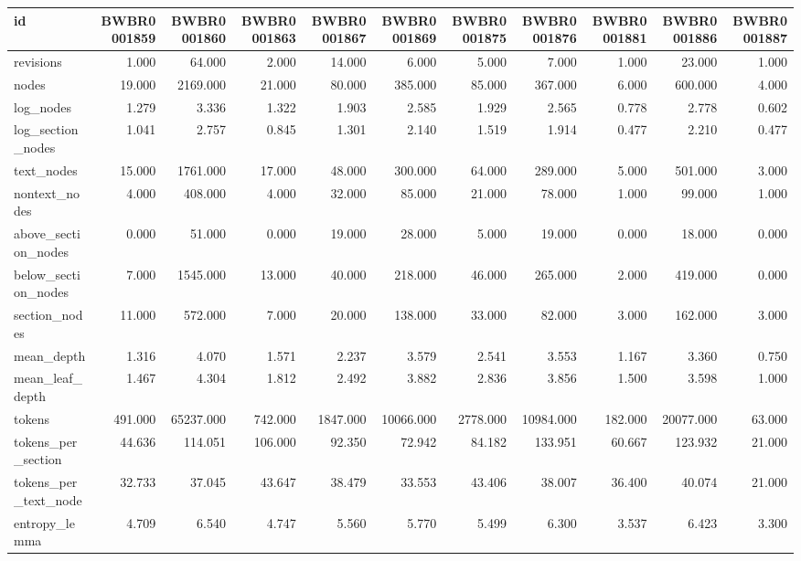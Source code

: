 \begin{tabular}{lrrrrrrrrrr}
\toprule
id & BWBR0001859 & BWBR0001860 & BWBR0001863 & BWBR0001867 & BWBR0001869 & BWBR0001875 & BWBR0001876 & BWBR0001881 & BWBR0001886 & BWBR0001887 \\
\midrule
revisions & 1.000 & 64.000 & 2.000 & 14.000 & 6.000 & 5.000 & 7.000 & 1.000 & 23.000 & 1.000 \\
\cline{1-11}
nodes & 19.000 & 2169.000 & 21.000 & 80.000 & 385.000 & 85.000 & 367.000 & 6.000 & 600.000 & 4.000 \\
\cline{1-11}
log\_nodes & 1.279 & 3.336 & 1.322 & 1.903 & 2.585 & 1.929 & 2.565 & 0.778 & 2.778 & 0.602 \\
\cline{1-11}
log\_section\_nodes & 1.041 & 2.757 & 0.845 & 1.301 & 2.140 & 1.519 & 1.914 & 0.477 & 2.210 & 0.477 \\
\cline{1-11}
text\_nodes & 15.000 & 1761.000 & 17.000 & 48.000 & 300.000 & 64.000 & 289.000 & 5.000 & 501.000 & 3.000 \\
\cline{1-11}
nontext\_nodes & 4.000 & 408.000 & 4.000 & 32.000 & 85.000 & 21.000 & 78.000 & 1.000 & 99.000 & 1.000 \\
\cline{1-11}
above\_section\_nodes & 0.000 & 51.000 & 0.000 & 19.000 & 28.000 & 5.000 & 19.000 & 0.000 & 18.000 & 0.000 \\
\cline{1-11}
below\_section\_nodes & 7.000 & 1545.000 & 13.000 & 40.000 & 218.000 & 46.000 & 265.000 & 2.000 & 419.000 & 0.000 \\
\cline{1-11}
section\_nodes & 11.000 & 572.000 & 7.000 & 20.000 & 138.000 & 33.000 & 82.000 & 3.000 & 162.000 & 3.000 \\
\cline{1-11}
mean\_depth & 1.316 & 4.070 & 1.571 & 2.237 & 3.579 & 2.541 & 3.553 & 1.167 & 3.360 & 0.750 \\
\cline{1-11}
mean\_leaf\_depth & 1.467 & 4.304 & 1.812 & 2.492 & 3.882 & 2.836 & 3.856 & 1.500 & 3.598 & 1.000 \\
\cline{1-11}
tokens & 491.000 & 65237.000 & 742.000 & 1847.000 & 10066.000 & 2778.000 & 10984.000 & 182.000 & 20077.000 & 63.000 \\
\cline{1-11}
tokens\_per\_section & 44.636 & 114.051 & 106.000 & 92.350 & 72.942 & 84.182 & 133.951 & 60.667 & 123.932 & 21.000 \\
\cline{1-11}
tokens\_per\_text\_node & 32.733 & 37.045 & 43.647 & 38.479 & 33.553 & 43.406 & 38.007 & 36.400 & 40.074 & 21.000 \\
\cline{1-11}
entropy\_lemma & 4.709 & 6.540 & 4.747 & 5.560 & 5.770 & 5.499 & 6.300 & 3.537 & 6.423 & 3.300 \\

\end{tabular}
